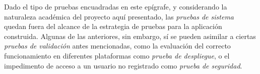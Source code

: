 Dado el tipo de pruebas encuadradas en este epígrafe, y considerando la naturaleza académica del proyecto aquí presentado, las \emph{pruebas de sistema} quedan fuera del alcance de la estrategia de pruebas para la aplicación construida. Algunas de las anteriores, sin embargo, sí se pueden asimilar a ciertas \emph{pruebas de validación} antes mencionadas, como la evaluación del correcto funcionamiento en diferentes plataformas como \emph{prueba de despliegue}, o el impedimento de acceso a un usuario no registrado como \emph{prueba de seguridad}.



